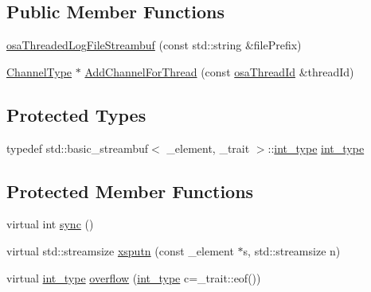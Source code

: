 \subsection*{Public Member Functions}
\begin{DoxyCompactItemize}
\item 
\hyperlink{classosa_threaded_log_file_streambuf_a4ef5ef4896d14022f68b32dbeafbd0c2}{osa\+Threaded\+Log\+File\+Streambuf} (const std\+::string \&file\+Prefix)
\item 
\hyperlink{classosa_threaded_log_file_streambuf_a216ca33908152519430e5456e828805f}{Channel\+Type} $\ast$ \hyperlink{classosa_threaded_log_file_streambuf_a059c2cbfffeb0ecc80cdf23c1f1939e6}{Add\+Channel\+For\+Thread} (const \hyperlink{classosa_thread_id}{osa\+Thread\+Id} \&thread\+Id)
\end{DoxyCompactItemize}
\subsection*{Protected Types}
\begin{DoxyCompactItemize}
\item 
typedef std\+::basic\+\_\+streambuf$<$ \+\_\+element, \+\_\+trait $>$\+::\hyperlink{classosa_threaded_log_file_streambuf_aac7f3a06c7b5f2824da9634732698e4b}{int\+\_\+type} \hyperlink{classosa_threaded_log_file_streambuf_aac7f3a06c7b5f2824da9634732698e4b}{int\+\_\+type}
\end{DoxyCompactItemize}
\subsection*{Protected Member Functions}
\begin{DoxyCompactItemize}
\item 
virtual int \hyperlink{classosa_threaded_log_file_streambuf_aaf9cb36fea5412016f33e84b029c40c8}{sync} ()
\item 
virtual std\+::streamsize \hyperlink{classosa_threaded_log_file_streambuf_a81d062496b7afa56309b41909f63cbe9}{xsputn} (const \+\_\+element $\ast$s, std\+::streamsize n)
\item 
virtual \hyperlink{classosa_threaded_log_file_streambuf_aac7f3a06c7b5f2824da9634732698e4b}{int\+\_\+type} \hyperlink{classosa_threaded_log_file_streambuf_aecc7d94de57ab54fc8ab15ff941e5f92}{overflow} (\hyperlink{classosa_threaded_log_file_streambuf_aac7f3a06c7b5f2824da9634732698e4b}{int\+\_\+type} c=\+\_\+trait\+::eof())
\end{DoxyCompactItemize}


